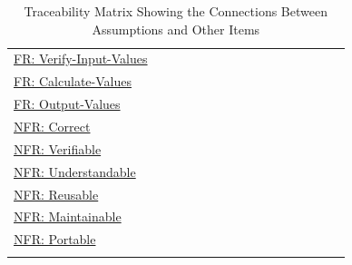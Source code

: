 \documentclass[12pt]{article}
\begin{document}
\begin{longtable}{l l l l l l l l l l l l l l l l}
\\
\hyperref[verifyInVals]{FR: Verify-Input-Values} &  &  &  &  &  &  &  &  &  &  &  &  &  &  & 
\\
\hyperref[calcValues]{FR: Calculate-Values} &  &  &  &  &  &  &  &  &  &  &  &  &  &  & 
\\
\hyperref[outputValues]{FR: Output-Values} &  &  &  &  &  &  &  &  &  &  &  &  &  &  & 
\\
\hyperref[correct]{NFR: Correct} &  &  &  &  &  &  &  &  &  &  &  &  &  &  & 
\\
\hyperref[verifiable]{NFR: Verifiable} &  &  &  &  &  &  &  &  &  &  &  &  &  &  & 
\\
\hyperref[understandable]{NFR: Understandable} &  &  &  &  &  &  &  &  &  &  &  &  &  &  & 
\\
\hyperref[reusable]{NFR: Reusable} &  &  &  &  &  &  &  &  &  &  &  &  &  &  & 
\\
\hyperref[maintainable]{NFR: Maintainable} &  &  &  &  &  &  &  &  &  &  &  &  &  &  & 
\\
\hyperref[portable]{NFR: Portable} &  &  &  &  &  &  &  &  &  &  &  &  &  &  & 
\\
\bottomrule
\caption{Traceability Matrix Showing the Connections Between Assumptions and Other Items}
\label{Table:TraceMatAvsAll}
\end{longtable}
\end{document}
